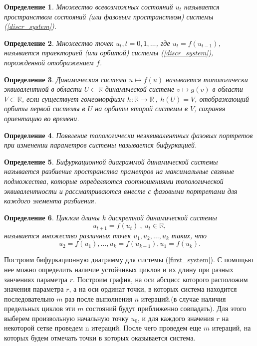 \documentclass[10pt]{article}
\newtheorem{definition}{Определение}
\numberwithin{equation}{section}
\begin{document}
\begin{definition}
	Множество всевозможных состояний \( u_t \) называется пространством состояний (или фазовым пространством) системы (\ref{discr_system}).
\end{definition}

\begin{definition}
	Множество точек \( u_t , t = 0, 1, \dots \), где \(u_t = f(u_{t-1})\), называется траекторией (или орбитой) системы (\ref{discr_system}), порожденной отображением \( f \).
\end{definition}

\begin{definition}
	Динамическая система \( u \mapsto f(u) \) называется топологически эквивалентной в области \( U \subset \mathbb{R} \) динамической системе \( v \mapsto g(v) \) в области \( V \subset \mathbb{R} \), если существует гомеоморфизм \( h : \mathbb{R} \to \mathbb{R}  \ , \ h(U) = V\), отображающий орбиты первой системы в \( U \) на орбиты второй системы в \( V \), сохраняя ориентацию во времени.
\end{definition}

\begin{definition}
	Появление топологически неэквивалентных фазовых портретов при изменении параметров системы называется бифуркацией.
\end{definition}

\begin{definition}
	Бифуркационной диаграммой динамической системы называется разбиение пространства праметров на максимальные свзяные подможества, которые определяются соотношениями топологической эквивалентности и рассматриваются вместе с фазовыми портретами для каждого элемента разбиения.
\end{definition}

\begin{definition}
	Циклом длины \( k \) дискретной динамической системы 
	\[ u_{t+1} = f(u_t) \ , \ u_t \in \mathbb{R},\]
	называется множество различных точек \( u_1, u_2, \dots, u_k \) таких, что 
	\[u_2 = f(u_1), \dots, u_k = f(u_{k-1}), u_1 = f(u_k).\]
\end{definition}

Построим бифуркационную диаграмму для системы (\ref{first_system}). С помощью нее можно определить наличие устойчивых циклов и их длину при разных занчениях параметра \( r \). Построим график, на оси абсцисс которого расположим значения параметра \( r \), а на оси ординат точки, в которых система находится последовательно \( m \) раз после выполнения \( n \) итераций.(в случае наличия предельных циклов эти \( m \) состояний будут приближенно совпадать). Для этого выберем произвольную начальную точку \( u_0 \), и для каждого значения \( r \) на некоторой сетке проведем n итераций. После чего проведем еще \( m \) итераций, на которых будем отмечать точки в которых оказывается система. 
\end{document}
